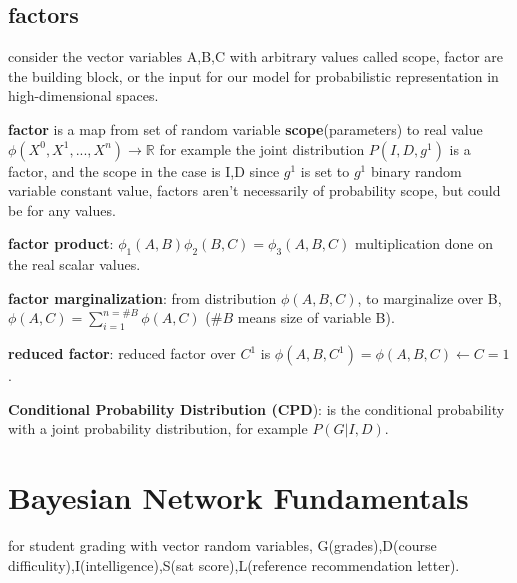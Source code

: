 \documentclass[4apaper,12pt]{book}
\begin{document}
\begin{description}
\begin{description}
      \subsection{factors}
      \begin{description}
      \item consider the vector variables A,B,C with arbitrary values called scope, factor are the building block, or the input for our model for probabilistic representation in high-dimensional spaces.
      \item \textbf{factor} is a map from set of random variable \textbf{scope}(parameters) to real value $\phi(X^0,X^1,...,X^n) \rightarrow \mathbb{R}$ for example the joint distribution $P(I,D,g^1)$ is a factor, and the scope in the case is I,D since $g^1$ is set to $g^1$ binary random variable constant value, factors aren't necessarily of probability scope, but could be for any values.
      \item \textbf{factor product}:  $\phi_1{(A,B)} \phi_2{(B,C)}=\phi_3{(A,B,C)}$ multiplication done on the real scalar values.
      \item \textbf{factor marginalization}: from distribution $\phi{(A,B,C)}$, to marginalize over B, $\phi{(A,C)}=\sum_{i=1}^{n={\#B}}\phi(A,C)$ ($\#B$ means size of variable B).
      \item \textbf{reduced factor}: reduced factor over $C^1$ is $\phi{(A,B,C^1)}=\phi{(A,B,C)} \leftarrow {C=1}$.
      \end{description}
    \item \textbf{Conditional Probability Distribution (CPD}): is the conditional probability with a joint probability distribution, for example $P(G|I,D)$.

    \end{description}
    \section{Bayesian Network Fundamentals}
    \begin{description}
    \item for student grading with vector random variables, G(grades),D(course difficulity),I(intelligence),S(sat score),L(reference recommendation letter).

\end{description}
\end{description}
\end{document}
